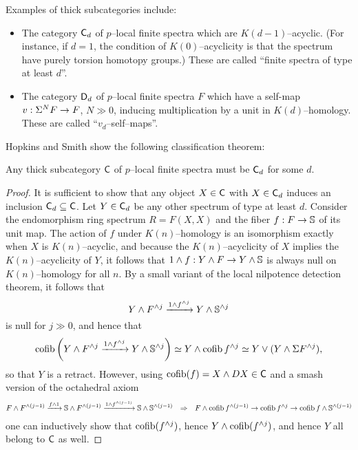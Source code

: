 \noindent Examples of thick subcategories include:
\begin{itemize}
\item The category $\CatOf{C}_d$ of $p$--local finite spectra which are $K(d-1)$--acyclic.  (For instance, if $d = 1$, the condition of $K(0)$--acyclicity is that the spectrum have purely torsion homotopy groups.)  These are called ``finite spectra of type at least $d$''.
\item The category $\CatOf{D}_d$ of $p$--local finite spectra $F$ which have a self-map $v: \Susp^N F \to F$, $N \gg 0$, inducing multiplication by a unit in $K(d)$--homology.  These are called ``$v_d$--self--maps''.
\end{itemize}
Hopkins and Smith show the following classification theorem:

\begin{theorem}
Any thick subcategory $\CatOf C$ of $p$--local finite spectra must be $\CatOf C_d$ for some $d$.
\end{theorem}
\begin{proof}
It is sufficient to show that any object $X \in \CatOf C$ with $X \in \CatOf C_d$ induces an inclusion $\CatOf C_d \subseteq \CatOf C$.  Let $Y \in \CatOf C_d$ be any other spectrum of type at least $d$.  Consider the endomorphism ring spectrum $R = F(X, X)$ and the fiber $f: F \to \S$ of its unit map.  The action of $f$ under $K(n)$--homology is an isomorphism exactly when $X$ is $K(n)$--acyclic, and because the $K(n)$--acyclicity of $X$ implies the $K(n)$--acyclicity of $Y$, it follows that $1 \sm f: Y \sm F \to Y \sm \S$ is always null on $K(n)$--homology for all $n$.  By a small variant of the local nilpotence detection theorem, it follows that \[Y \sm F^{\sm j} \xrightarrow{1 \sm f^{\sm j}} Y \sm \S^{\sm j}\] is null for $j \gg 0$, and hence that \[\operatorname{cofib}\left( Y \sm F^{\sm j} \xrightarrow{1 \sm f^{\sm j}} Y \sm \S^{\sm j} \right) \simeq Y \sm \operatorname{cofib} f^{\sm j} \simeq Y \vee (Y \sm \Susp F^{\sm j}),\] so that $Y$ is a retract.  However, using $\operatorname{cofib}(f) = X \sm DX \in \CatOf C$ and a smash version of the octahedral axiom
\begin{align*}
F \sm F^{\sm (j-1)} & \xrightarrow{f \sm 1} \S \sm F^{\sm (j-1)} \xrightarrow{1 \sm f^{\sm (j-1)}} \S \sm \S^{\sm (j-1)} & \Rightarrow & &  F \sm \operatorname{cofib} f^{\sm (j-1)} \to \operatorname{cofib} f^{\sm j} \to \operatorname{cofib} f \sm \S^{\sm (j-1)}
\end{align*}
one can inductively show that $\operatorname{cofib}(f^{\sm j})$, hence $Y \sm \operatorname{cofib}(f^{\sm j})$, and hence $Y$ all belong to $\CatOf C$ as well.
\end{proof}

